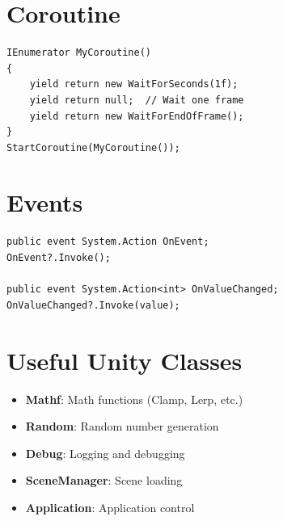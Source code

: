 \section{Coroutine}

\begin{lstlisting}[language={[Sharp]C}]
IEnumerator MyCoroutine()
{
    yield return new WaitForSeconds(1f);
    yield return null;  // Wait one frame
    yield return new WaitForEndOfFrame();
}
StartCoroutine(MyCoroutine());
\end{lstlisting}

\section{Events}

\begin{lstlisting}[language={[Sharp]C}]
public event System.Action OnEvent;
OnEvent?.Invoke();

public event System.Action<int> OnValueChanged;
OnValueChanged?.Invoke(value);
\end{lstlisting}

\section{Useful Unity Classes}

\begin{itemize}
\item \textbf{Mathf}: Math functions (Clamp, Lerp, etc.)
\item \textbf{Random}: Random number generation
\item \textbf{Debug}: Logging and debugging
\item \textbf{SceneManager}: Scene loading
\item \textbf{Application}: Application control
\end{itemize}
